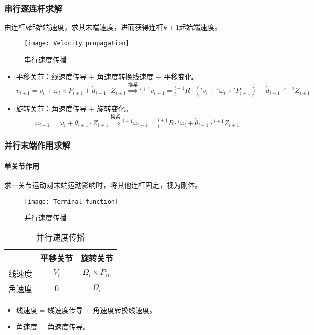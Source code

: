 \documentclass[
12pt, %
a4paper, 
oneside, %
headinclude,footinclude, %
]{scrartcl}
\begin{document}
\subsubsection[串行逐连杆求解]{串行逐连杆求解}
由连杆$ k $起始端速度，求其末端速度，进而获得连杆$ k + 1 $起始端速度。

\begin{figure}[H]
\centering 
\texttt{[image: Velocity propagation]} 
\caption{串行速度传播}
\end{figure}

\begin{itemize}
\item 平移关节：线速度传导 + 角速度转换线速度 + 平移变化。
$$
v_{i + 1} = v_i + \omega_i \times P_{i + 1} + \dot{d}_{i + 1} \cdot Z_{i + 1}
\overset{\text{换系}}{\Longrightarrow}
{}^{i + 1}v_{i + 1} = {}^{i + 1}_i R \cdot ({}^i v_i + {}^i \omega_i \times {}^i P_{i + 1}) + \dot{d}_{i + 1} \cdot {}^{i + 1}Z_{i + 1}
$$
\item 旋转关节：角速度传导 + 旋转变化。
$$
\omega_{i + 1} = \omega_i + \dot{\theta}_{i + 1} \cdot Z_{i + 1}
\overset{\text{换系}}{\Longrightarrow}
{}^{i + 1}\omega_{i + 1} = {}^{i + 1}_i R \cdot {}^i \omega_i + \dot{\theta}_{i + 1} \cdot {}^{i + 1}Z_{i + 1}
$$
\end{itemize} 
\subsubsection[并行末端作用求解]{并行末端作用求解}
\paragraph{单关节作用}\label{sec:bingxing}
求一关节运动对末端运动影响时，将其他连杆固定，视为刚体。 \\
\noindent
\begin{minipage}{0.6\textwidth}
\begin{figure}[H]
\centering 
\texttt{[image: Terminal function]} 
\caption{并行速度传播}
\end{figure}
\end{minipage}
\begin{minipage}{0.4\textwidth}
\begin{table}[H]
\centering
\begin{tabular}{c|cc}
\hline
& 平移关节 & 旋转关节 \\
\hline
线速度 & $ V_i $ & $ \Omega_i \times P_{in} $ \\
角速度 & $ 0 $ & $ \Omega_i $ \\
\hline
\end{tabular}
\caption{并行速度传播}
\end{table}
\end{minipage}
\begin{itemize}
\item 线速度 = 线速度传导 + 角速度转换线速度。
\item 角速度 = 角速度传导。
\end{itemize} 
\end{document}
